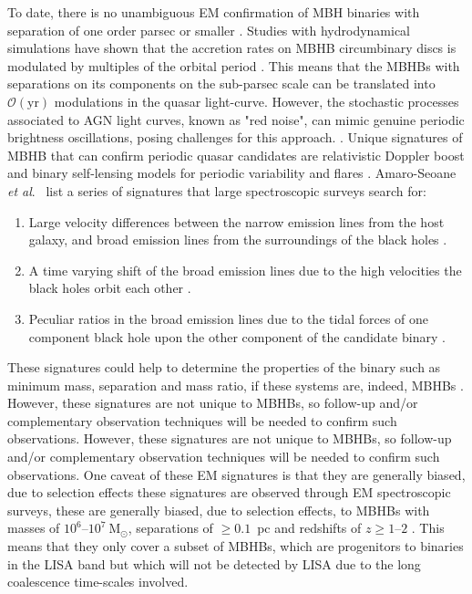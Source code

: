 \documentclass[a4paper,12pt]{article}
\begin{document}
To date, there is no unambiguous EM confirmation of MBH binaries with separation of one order parsec or smaller \cite{krause2025evidence,bogdanovic2022electromagnetic}. Studies with hydrodynamical simulations have shown that the accretion rates on MBHB circumbinary discs is modulated by multiples of the orbital period \cite{haiman2009population,macfadyen2008eccentric,d2013accretion}. This means that the MBHBs with separations on its components on the sub-parsec scale can be translated into $\mathcal{O}(\mathrm{yr})$ modulations in the quasar light-curve. However, the stochastic processes associated to AGN light curves, known as "red noise", can mimic genuine periodic brightness oscillations, posing challenges for this approach. \cite{vaughan2016false}. Unique signatures of MBHB that can confirm periodic quasar candidates are relativistic Doppler boost and binary self-lensing models for periodic variability and flares \cite{d2015relativistic,d2018periodic,hu2020spikey,charisi2018testing}. Amaro-Seoane \textit{et al}.\ \cite{amaro2023astrophysics} list a series of signatures that large spectroscopic surveys search for: 
\begin{enumerate}
    \item Large velocity differences between the narrow emission lines from the host galaxy, and broad emission lines from the surroundings of the black holes \cite{tsalmantza2011systematic,eracleous2012large,liu2014constraining,runnoe2015large}.
    \item A time varying shift of the broad emission lines due to the high velocities the black holes orbit each other \cite{ju2013search,wang2017searching,guo2019constraining}.
    \item Peculiar ratios in the broad emission lines due to the tidal forces of one component black hole upon the other component of the candidate binary \cite{montuori2011search,montuori2012search}.
\end{enumerate}
These signatures could help to determine the properties of the binary such as minimum mass, separation and mass ratio, if these systems are, indeed, MBHBs \cite{nguyen2016emission,bon2016evidence,nguyen2020emission}. However, these signatures are not unique to MBHBs, so follow-up and/or complementary observation techniques will be needed to confirm such observations. However, these signatures are not unique to MBHBs, so follow-up and/or complementary observation techniques will be needed to confirm such observations. One caveat of these EM signatures is that they are generally biased, due to selection effects these signatures are observed through EM spectroscopic surveys, these are generally biased, due to selection effects, to MBHBs with masses of $10^{6}$--$10^{7}~\mathrm{M}_{\odot}$, separations of $\geq0.1$~pc and redshifts of $z\geq1$--$2$ \cite{pflueger2018likelihood,xin2021ultra,nguyen2016emission}. This means that they only cover a subset of MBHBs, which are progenitors to binaries in the LISA band but which will not be detected by LISA due to the long coalescence time-scales involved.
\end{document}
